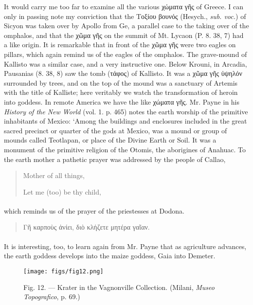 \documentclass[a4paper, 11pt, oneside, polutonikogreek, english]{article}
\begin{document}
It would carry me too far to examine all the various χώματα γῆς of Greece. I can only in passing note my conviction that the Τοξίου βουνός (Hesych., \emph{sub. voc.}) of Sicyon was taken over by Apollo from Ge, a parallel case to the taking over of the omphalos, and that the χῶμα γῆς on the summit of Mt. Lycaon (P. 8. 38, 7) had a like origin. It is remarkable that in front of the χῶμα γῆς were two eagles on pillars, which again remind us of the eagles of the omphalos. The grave-mound of Kallisto was a similar case, and a very instructive one. Below Krouni, in Arcadia, Pausanias (8. 38, 8) saw the tomb (τάφος) of Kallisto. It was a χῶμα γῆς ὑψηλόν surrounded by trees, and on the top of the mound was a sanctuary of Artemis with the title of Kalliste; here veritably we watch the transformation of heroin into goddess. In remote America we have the like χώματα γῆς. Mr. Payne in his \emph{History of the New World} (vol. 1. p. 465) notes the earth worship of the primitive inhabitants of Mexico: `Among the buildings and enclosures included in the great sacred precinct or quarter of the gods at Mexico, was a mound or group of mounds called Teotlapan, or place of the Divine Earth or Soil. It was a monument of the primitive religion of the Otomis, the aborigines of Anahuac. To the earth mother a pathetic prayer was addressed by the people of Callao,
\begin{quotation}
Mother of all things,

Let me (too) be thy child,
\end{quotation}
\paragraph{}
which reminds us of the prayer of the priestesses at Dodona.
\begin{quotation}
Γῆ καρποὺς ἀνίει, διὸ κλήζετε μητέρα γαῖαν.
\end{quotation}
\paragraph{}
It is interesting, too, to learn again from Mr. Payne that as agriculture advances, the earth goddess develops into the maize goddess, Gaia into Demeter.
\begin{figure}[H]
\centering
\texttt{[image: figs/fig12.png]}
\caption{Fig. 12. --- Krater in the Vagnonville Collection. (Milani, \emph{Museo Topografico}, p. 69.)}
\end{figure}
\end{document}
